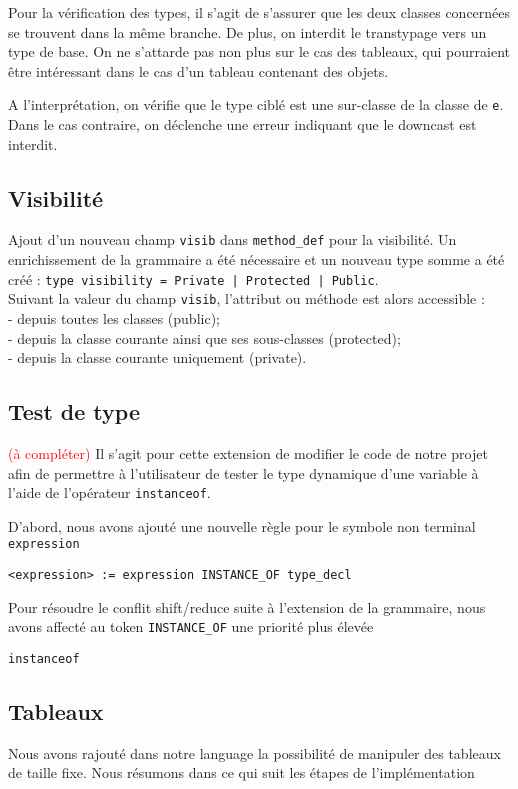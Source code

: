 \documentclass{article}
\begin{document}
Pour la vérification des types, il s'agit de s'assurer que les deux classes concernées 
se trouvent dans la même branche. De plus, on interdit le transtypage vers un type de base.
On ne s'attarde pas non plus sur le cas des tableaux, qui pourraient être intéressant dans le cas d'un tableau contenant des objets.

A l'interprétation, on vérifie que le type ciblé est une sur-classe de la classe de \texttt{e}. Dans le cas contraire, on déclenche 
une erreur indiquant que le downcast est interdit.

\subsection{Visibilité}
Ajout d'un nouveau champ \texttt{visib} dans \texttt{method\_def} pour la visibilité. Un enrichissement de la grammaire a été nécessaire et un nouveau type somme a été créé : \texttt{type visibility = Private | Protected | Public}.\\
Suivant la valeur du champ \texttt{visib}, l'attribut ou méthode est alors accessible :
\smallskip \\
- depuis toutes les classes (public);\\
- depuis la classe courante ainsi que ses sous-classes (protected);\\
- depuis la classe courante uniquement (private).
\subsection{Test de type}
\textcolor{red}{(à compléter)}
Il s'agit pour cette extension de modifier le code de notre projet afin 
de permettre à l'utilisateur de tester le type dynamique d'une variable à l'aide 
de l'opérateur \texttt{instanceof}.

D'abord, nous avons ajouté une nouvelle règle pour le symbole non terminal \texttt{expression}
\begin{lstlisting}[style=mystyle]
    <expression> := expression INSTANCE_OF type_decl    
\end{lstlisting}

Pour résoudre le conflit shift/reduce suite à l'extension de la grammaire,
nous avons affecté au token \texttt{INSTANCE\_OF} une priorité plus élevée



\texttt{instanceof}

\subsection{Tableaux}
Nous avons rajouté dans notre language la possibilité de manipuler 
des tableaux de taille fixe. Nous résumons dans ce qui suit les étapes de l'implémentation
\end{document}
